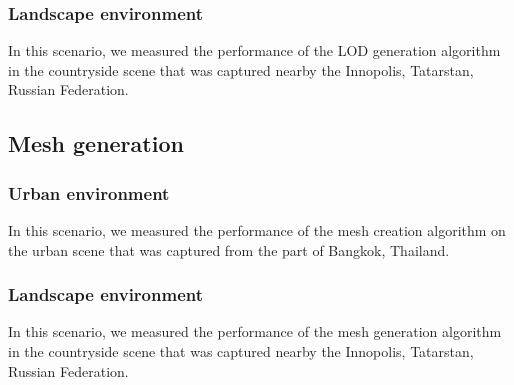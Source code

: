 \subsubsection{Landscape environment}

In this scenario, we measured the performance of the LOD generation algorithm in the countryside scene that was captured nearby the Innopolis, Tatarstan, Russian Federation.



\subsection{Mesh generation}

\subsubsection{Urban environment}

In this scenario, we measured the performance of the mesh creation algorithm on the urban scene that was captured from the part of Bangkok, Thailand.



\subsubsection{Landscape environment}

In this scenario, we measured the performance of the mesh generation algorithm in the countryside scene that was captured nearby the Innopolis, Tatarstan, Russian Federation.


